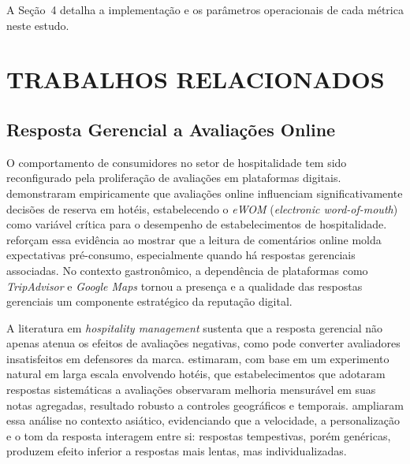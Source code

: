 \documentclass[12pt, a4paper]{article}
\numberwithin{equation}{section}
\begin{document}
A Seção~4 detalha a implementação e os parâmetros operacionais de cada métrica neste estudo.


\newpage
\newpage

\section{TRABALHOS RELACIONADOS}

\subsection{Resposta Gerencial a Avaliações Online}

O comportamento de consumidores no setor de hospitalidade tem sido reconfigurado pela proliferação de avaliações em plataformas digitais.  demonstraram empiricamente que avaliações online influenciam significativamente decisões de reserva em hotéis, estabelecendo o \textit{eWOM} (\textit{electronic word-of-mouth}) como variável crítica para o desempenho de estabelecimentos de hospitalidade.  reforçam essa evidência ao mostrar que a leitura de comentários online molda expectativas pré-consumo, especialmente quando há respostas gerenciais associadas. No contexto gastronômico, a dependência de plataformas como \textit{TripAdvisor} e \textit{Google Maps} tornou a presença e a qualidade das respostas gerenciais um componente estratégico da reputação digital.

A literatura em \textit{hospitality management} sustenta que a resposta gerencial não apenas atenua os efeitos de avaliações negativas, como pode converter avaliadores insatisfeitos em defensores da marca.  estimaram, com base em um experimento natural em larga escala envolvendo hotéis, que estabelecimentos que adotaram respostas sistemáticas a avaliações observaram melhoria mensurável em suas notas agregadas, resultado robusto a controles geográficos e temporais.  ampliaram essa análise no contexto asiático, evidenciando que a velocidade, a personalização e o tom da resposta interagem entre si: respostas tempestivas, porém genéricas, produzem efeito inferior a respostas mais lentas, mas individualizadas.
\end{document}
